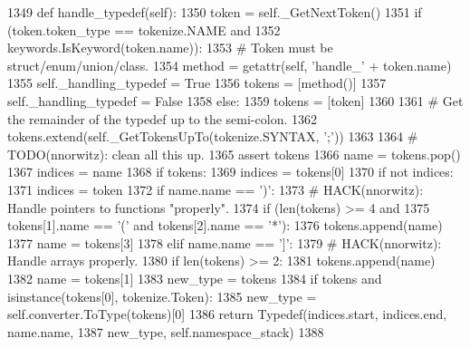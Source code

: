 \begin{DoxyCode}
1349     \textcolor{keyword}{def }handle\_typedef(self):
1350         token = self.\_GetNextToken()
1351         \textcolor{keywordflow}{if} (token.token\_type == tokenize.NAME \textcolor{keywordflow}{and}
1352             keywords.IsKeyword(token.name)):
1353             \textcolor{comment}{# Token must be struct/enum/union/class.}
1354             method = getattr(self, \textcolor{stringliteral}{'handle\_'} + token.name)
1355             self.\_handling\_typedef = \textcolor{keyword}{True}
1356             tokens = [method()]
1357             self.\_handling\_typedef = \textcolor{keyword}{False}
1358         \textcolor{keywordflow}{else}:
1359             tokens = [token]
1360 
1361         \textcolor{comment}{# Get the remainder of the typedef up to the semi-colon.}
1362         tokens.extend(self.\_GetTokensUpTo(tokenize.SYNTAX, \textcolor{stringliteral}{';'}))
1363 
1364         \textcolor{comment}{# TODO(nnorwitz): clean all this up.}
1365         \textcolor{keyword}{assert} tokens
1366         name = tokens.pop()
1367         indices = name
1368         \textcolor{keywordflow}{if} tokens:
1369             indices = tokens[0]
1370         \textcolor{keywordflow}{if} \textcolor{keywordflow}{not} indices:
1371             indices = token
1372         \textcolor{keywordflow}{if} name.name == \textcolor{stringliteral}{')'}:
1373             \textcolor{comment}{# HACK(nnorwitz): Handle pointers to functions "properly".}
1374             \textcolor{keywordflow}{if} (len(tokens) >= 4 \textcolor{keywordflow}{and}
1375                 tokens[1].name == \textcolor{stringliteral}{'('} \textcolor{keywordflow}{and} tokens[2].name == \textcolor{stringliteral}{'*'}):
1376                 tokens.append(name)
1377                 name = tokens[3]
1378         \textcolor{keywordflow}{elif} name.name == \textcolor{stringliteral}{']'}:
1379             \textcolor{comment}{# HACK(nnorwitz): Handle arrays properly.}
1380             \textcolor{keywordflow}{if} len(tokens) >= 2:
1381                 tokens.append(name)
1382                 name = tokens[1]
1383         new\_type = tokens
1384         \textcolor{keywordflow}{if} tokens \textcolor{keywordflow}{and} isinstance(tokens[0], tokenize.Token):
1385             new\_type = self.converter.ToType(tokens)[0]
1386         \textcolor{keywordflow}{return} Typedef(indices.start, indices.end, name.name,
1387                        new\_type, self.namespace\_stack)
1388 
\end{DoxyCode}
